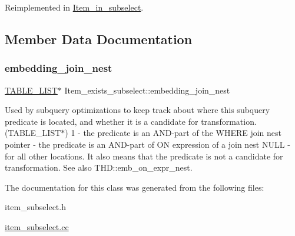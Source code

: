 Reimplemented in \mbox{\hyperlink{classItem__in__subselect_a9db1ebc564af4086152ac6daf8809b40}{Item\+\_\+in\+\_\+subselect}}.



\subsection{Member Data Documentation}
\mbox{\label{classItem__exists__subselect_a7673d8a6fa6fd258b50580afc67839d3}} 
\subsubsection{\texorpdfstring{embedding\+\_\+join\+\_\+nest}{embedding\_join\_nest}}
{\footnotesize\ttfamily \mbox{\hyperlink{structTABLE__LIST}{T\+A\+B\+L\+E\+\_\+\+L\+I\+ST}}$\ast$ Item\+\_\+exists\+\_\+subselect\+::embedding\+\_\+join\+\_\+nest}

Used by subquery optimizations to keep track about where this subquery predicate is located, and whether it is a candidate for transformation. (T\+A\+B\+L\+E\+\_\+\+L\+I\+S\+T$\ast$) 1 -\/ the predicate is an A\+ND-\/part of the W\+H\+E\+RE join nest pointer -\/ the predicate is an A\+ND-\/part of ON expression of a join nest N\+U\+LL -\/ for all other locations. It also means that the predicate is not a candidate for transformation. See also T\+H\+D\+::emb\+\_\+on\+\_\+expr\+\_\+nest. 

The documentation for this class was generated from the following files\+:\begin{DoxyCompactItemize}
\item 
item\+\_\+subselect.\+h\item 
\mbox{\hyperlink{item__subselect_8cc}{item\+\_\+subselect.\+cc}}\end{DoxyCompactItemize}
